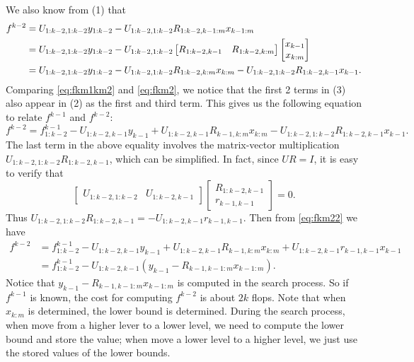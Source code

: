 \documentclass[11pt]{article}	%
\numberwithin{algorithm}{section}
\begin{document}
We also know from (1) that 
\begin{align} 
f^{k-2} &= U_{1:k-2,1:k-2}y_{1:k-2}-U_{1:k-2,1:k-2}R_{1:k-2,k-1:m}x_{k-1:m}  \notag
\\
&= U_{1:k-2,1:k-2}y_{1:k-2}-U_{1:k-2,1:k-2}
\begin{bmatrix}
R_{1:k-2,k-1} & R_{1:k-2,k:m}
\end{bmatrix}\begin{bmatrix}
x_{k-1}\\
x_{k:m} 
\end{bmatrix}  \notag
\\
&= U_{1:k-2,1:k-2}y_{1:k-2}-U_{1:k-2,1:k-2}R_{1:k-2,k:m}x_{k:m}-U_{1:k-2,1:k-2}R_{1:k-2,k-1}x_{k-1}.
\label{eq:fkm2}
\end{align}
Comparing \eqref{eq:fkm1km2} and \eqref {eq:fkm2},
we  notice that the first 2 terms in (3) also appear in (2) as the first and third term. 
This gives us the following equation to relate $f^{k-1}$ and $f^{k-2}$:
\begin{equation}
f^{k-2} = f^{k-1}_{1:k-2}  - U_{1:k-2,k-1}y_{k-1} + U_{1:k-2,k-1}R_{k-1,k:m}x_{k:m}- U_{1:k-2,1:k-2}R_{1:k-2,k-1}x_{k-1}.
\label{eq:fkm22}
\end{equation}
The last term in the above equality involves the matrix-vector multiplication $U_{1:k-2,1:k-2}R_{1:k-2,k-1}$, which can be simplified.
In fact, since $UR=I$, it is easy to verify that 
$$
\begin{bmatrix} U_{1:k-2,1:k-2} & U_{1:k-2,k-1}\end{bmatrix} \begin{bmatrix} R_{1:k-2,k-1} \\ r_{k-1,k-1}\end{bmatrix} =0.
$$
Thus $U_{1:k-2,1:k-2}R_{1:k-2,k-1}=-U_{1:k-2,k-1}r_{k-1,k-1}$. 
Then from \eqref{eq:fkm22} we have 
\begin{align*}
f^{k-2} 
& = f^{k-1}_{1:k-2}  - U_{1:k-2,k-1}y_{k-1} + U_{1:k-2,k-1}R_{k-1,k:m}x_{k:m} + U_{1:k-2,k-1}r_{k-1,k-1} x_{k-1} \\
& = f^{k-1}_{1:k-2} - U_{1:k-2,k-1}(y_{k-1} - R_{k-1,k-1:m} x_{k-1:m}).
\end{align*}
Notice that $y_{k-1} - R_{k-1,k-1:m} x_{k-1:m}$ is computed in the search process.
So if $f^{k-1}$ is known,  the  cost for computing $f^{k-2}$ is  about $2k$ flops.
Note that when $x_{k:m}$ is determined, the lower bound is determined. 
During the search process, when move from a higher lever to a lower level, we need to compute the lower bound
and  store the value;  when  move a lower level to a higher level, we just use the stored values of the lower bounds.
 
\end{document}
